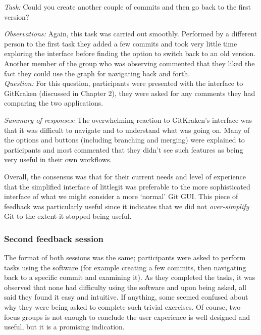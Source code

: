 \noindent \emph{Task: } Could you create another couple of commits and then go back to the first version?

\noindent \emph{Observations: } Again, this task was carried out smoothly. Performed by a different person to the first task they added a few commits and took very little time exploring the interface before finding the option to switch back to an old version. Another member of the group who was observing commented that they liked the fact they could use the graph for navigating back and forth.\\

\noindent \emph{Question: } For this question, participants were presented with the interface to GitKraken (discussed in Chapter 2), they were asked for any comments they had comparing the two applications.

\noindent \emph{Summary of responses: } The overwhelming reaction to GitKraken's interface was that it was difficult to navigate and to understand what was going on. Many of the options and buttons (including branching and merging) were explained to participants and most commented that they didn't see such features as being very useful in their own workflows. 

Overall, the consensus was that for their current needs and level of experience that the simplified interface of littlegit was preferable to the more sophisticated interface of what we might consider a more `normal' Git GUI. This piece of feedback was particularly useful since it indicates that we did not \emph{over-simplify} Git to the extent it stopped being useful.

\subsubsection{Second feedback session}





The format of both sessions was the same; participants were asked to perform tasks using the software (for example creating a few commits, then navigating back to a specific commit and examining it). As they completed the tasks, it was observed that none had difficulty using the software and upon being asked, all said they found it easy and intuitive. If anything, some seemed confused about why they were being asked to complete such trivial exercises. Of course, two focus groups is not enough to conclude the user experience is well designed and useful, but it is a promising indication.

